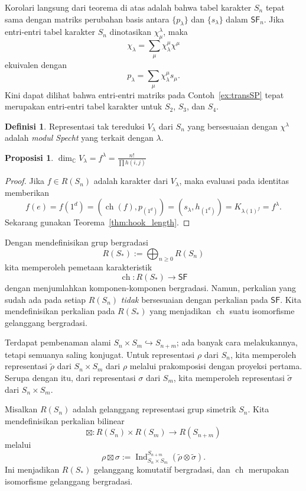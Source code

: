 \documentclass[12pt]{article}
\theoremstyle{plain}
\newtheorem{proposition}[theorem]{Proposisi}
\theoremstyle{definition}
\newtheorem{definition}[theorem]{Definisi}
\theoremstyle{remark}
\numberwithin{equation}{section}
\begin{document}
Korolari langsung dari teorema di atas adalah bahwa
tabel karakter $S_n$ tepat sama dengan
matriks perubahan basis antara $\{ p_\lambda \}$
dan $\{ s_\lambda \}$ dalam $\mathsf{SF}_n$.
Jika entri-entri tabel karakter $S_n$ dinotasikan
$\chi_\mu^\lambda$, maka
\[
\chi_\lambda = \sum_{\mu} \chi_\lambda^\mu \chi^\mu
\]
ekuivalen dengan
\[
p_\lambda = \sum_{\mu} \chi_\lambda^\mu s_\mu .
\]
Kini dapat dilihat bahwa entri-entri matriks pada Contoh~\ref{ex:transSP}
tepat merupakan entri-entri tabel karakter untuk $S_2$, $S_3$, dan
$S_4$.

\begin{definition}
Representasi tak tereduksi $V_\lambda$ dari $S_n$ yang bersesuaian dengan
$\chi^\lambda$ adalah \emph{modul Specht} yang terkait dengan $\lambda$.
\end{definition}

\begin{proposition}
$\displaystyle \dim_{\mathbb{C}} V_\lambda = f^\lambda
=\frac{n!}{\prod h(i,j)}$
\end{proposition}

\begin{proof}
Jika $f \in R(S_n)$ adalah karakter dari $V_\lambda$,
maka evaluasi pada identitas memberikan
\[
f(e)=f(1^d)= ( \operatorname{ch}(f), p_{(1^d)} )
= (s_\lambda, h_{(1^d)}) = K_{\lambda(1)^f}=f^\lambda.
\]
Sekarang gunakan Teorema~\ref{thm:hook_length}.
\end{proof}

Dengan mendefinisikan grup bergradasi
\[
R(S_\ast) := \bigoplus_{n \ge 0} R(S_n)
\]
kita memperoleh pemetaan karakteristik
\[
\operatorname{ch} : R(S_\ast) \to \mathsf{SF}
\]
dengan menjumlahkan komponen-komponen bergradasi.
Namun, perkalian yang sudah ada pada setiap $R(S_n)$
\emph{tidak} bersesuaian dengan perkalian pada $\mathsf{SF}$.
Kita mendefinisikan perkalian pada $R(S_\ast)$ yang menjadikan
$\operatorname{ch}$ suatu isomorfisme gelanggang bergradasi.

Terdapat pembenaman alami $S_n \times S_m \hookrightarrow S_{n+m}$;
ada banyak cara melakukannya, tetapi semuanya saling konjugat.
Untuk representasi $\rho$ dari $S_n$, kita memperoleh representasi
$\widetilde{\rho}$ dari $S_n \times S_m$ dari $\rho$ melalui prakomposisi
dengan proyeksi pertama. Serupa dengan itu, dari representasi $\sigma$
dari $S_m$, kita memperoleh representasi $\widetilde{\sigma}$ dari
$S_n \times S_m$.

Misalkan $R(S_n)$ adalah gelanggang representasi grup simetrik $S_n$. 
Kita mendefinisikan perkalian bilinear
\[ \boxtimes : R(S_n) \times R(S_m) \to R(S_{n+m}) \]
melalui
\[
\rho \boxtimes \sigma := \operatorname{Ind}_{S_n \times S_m}^{S_{n+m}}
(\widetilde{\rho} \otimes \widetilde{\sigma}).
\]
Ini menjadikan $R(S_\ast)$ gelanggang komutatif bergradasi,
dan $\operatorname{ch}$ merupakan isomorfisme gelanggang bergradasi.
\end{document}
